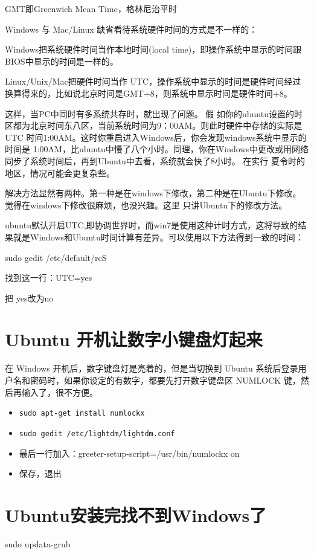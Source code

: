 {GMT即Greenwich Mean Time，格林尼治平时

Windows 与 Mac/Linux 缺省看待系统硬件时间的方式是不一样的：

Windows把系统硬件时间当作本地时间(local time)，即操作系统中显示的时间跟BIOS中显示的时间是一样的。

Linux/Unix/Mac把硬件时间当作 UTC，操作系统中显示的时间是硬件时间经过换算得来的，比如说北京时间是GMT+8，则系统中显示时间是硬件时间+8。

这样，当PC中同时有多系统共存时，就出现了问题。
假 如你的ubuntu设置的时区都为北京时间东八区，当前系统时间为9：00AM。则此时硬件中存储的实际是UTC 时间1:00AM。这时你重启进入Windows后，你会发现windows系统中显示的时间是 1:00AM，比ubuntu中慢了八个小时。同理，你在Windows中更改或用网络同步了系统时间后，再到Ubuntu中去看，系统就会快了8小时。 在实行 夏令时的地区，情况可能会更复杂些。

解决方法显然有两种。第一种是在windows下修改，第二种是在Ubuntu下修改。觉得在windows下修改很麻烦，也没兴趣。这里 只讲Ubuntu下的修改方法。

ubuntu默认开启UTC,即协调世界时，而win7是使用这种计时方式，这将导致的结果就是Windows和Ubuntu时间计算有差异。可以使用以下方法得到一致的时间：

sudo gedit /etc/default/rcS

找到这一行：UTC=yes

把 yes改为no



\section{Ubuntu 开机让数字小键盘灯起来  }
在 Windows 开机后，数字键盘灯是亮着的，但是当切换到 Ubuntu 系统后登录用户名和密码时，如果你设定的有数字，都要先打开数字键盘区 NUMLOCK 键，然后再输入了，很不方便。
\begin{itemize}
\item \verb*|sudo apt-get install numlockx|
\item \verb*|sudo gedit /etc/lightdm/lightdm.conf|
\item 最后一行加入：greeter-setup-script=/usr/bin/numlockx on
\item 保存，退出
\end{itemize}


\section{Ubuntu安装完找不到Windows了}
sudo updata-grub


}
